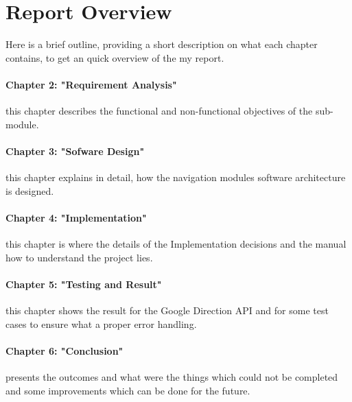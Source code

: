 	\section{Report Overview}
		Here is a brief outline, providing a short description on what each chapter contains, to get an
		quick overview of the my report.
		
		\paragraph{Chapter 2: "Requirement Analysis"}
			this chapter describes the functional and non-functional objectives of the sub-module. 
		\paragraph{Chapter 3: "Sofware Design"}
			this chapter explains in detail, how the navigation modules software architecture is designed. 
		\paragraph{Chapter 4: "Implementation"} 
			this chapter is where the details of the Implementation decisions and the manual how to understand 
			the project lies.
		\paragraph{Chapter 5: "Testing and Result"}
			this chapter shows the result for the Google Direction API and for some test cases to ensure what 
			a proper error handling. 
		\paragraph{Chapter 6: "Conclusion"} 
			presents the outcomes and what were the things which could not be completed and some improvements
			which can be done for the future.
